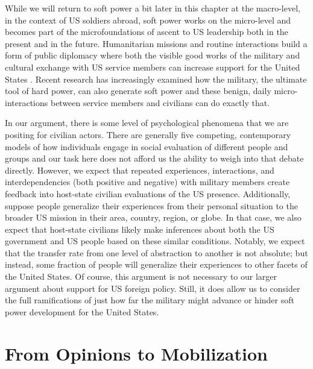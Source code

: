 {	While we will return to soft power a bit later in this chapter at the macro-level, in the context of US soldiers abroad, soft power works on the micro-level and becomes part of the microfoundations of ascent to US leadership both in the present and in the future. Humanitarian missions and routine interactions build a form of public diplomacy where both the visible good works of the military and cultural exchange with US service members can increase support for the United States \cite{cull2008cold}. Recent research has increasingly examined how the military, the ultimate tool of hard power, can also generate soft power \cite{atkinson2014military,Martinez2021} and these benign, daily micro-interactions between service members and civilians can do exactly that.
	
	In our argument, there is some level of psychological phenomena that we are positing for civilian actors. There are generally five competing, contemporary models of how individuals engage in social evaluation of different people and groups \cite{abele2021} and our task here does not afford us the ability to weigh into that debate directly. However, we expect that repeated experiences, interactions, and interdependencies (both positive and negative) with military members create feedback into host-state civilian evaluations of the US presence. Additionally, suppose people generalize their experiences from their personal situation to the broader US mission in their area, country, region, or globe. In that case, we also expect that host-state civilians likely make inferences about both the US government and US people based on these similar conditions. Notably, we expect that the transfer rate from one level of abstraction to another is not absolute; but instead, some fraction of people will generalize their experiences to other facets of the United States. Of course, this argument is not necessary to our larger argument about support for US foreign policy. Still, it does allow us to consider the full ramifications of just how far the military might advance or hinder soft power development for the United States.
	
	
\section*{From Opinions to Mobilization}
	
}
